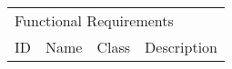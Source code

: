 \clearpage
\setlength\LTleft{-2.5cm}
\begin{longtable}{l p{3.5cm} p{0.8cm} p{12.5cm} }
\multicolumn{4}{l}{Functional Requirements}       
                                                                                                                                                                                                                              \\
ID                      & Name                                    & Class  & Description                                                                                                                                                                                                                         \\ \hline





\end{longtable}
